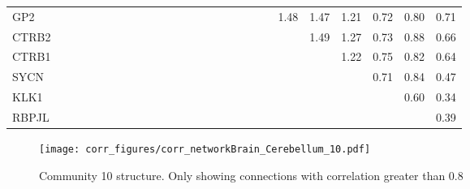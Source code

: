 \begin{longtable}{lrrrrrrrrrrrrrrrrrrrrrrrrr}
GP2      &              &              &              &             &             &             &             &            &              &            &            &            &             &           &             &                &           &               &           &        1.48 &        1.47 &       1.21 &       0.72 &        0.80 &        0.71 \\
CTRB2    &              &              &              &             &             &             &             &            &              &            &            &            &             &           &             &                &           &               &           &             &        1.49 &       1.27 &       0.73 &        0.88 &        0.66 \\
CTRB1    &              &              &              &             &             &             &             &            &              &            &            &            &             &           &             &                &           &               &           &             &             &       1.22 &       0.75 &        0.82 &        0.64 \\
SYCN     &              &              &              &             &             &             &             &            &              &            &            &            &             &           &             &                &           &               &           &             &             &            &       0.71 &        0.84 &        0.47 \\
KLK1     &              &              &              &             &             &             &             &            &              &            &            &            &             &           &             &                &           &               &           &             &             &            &            &        0.60 &        0.34 \\
RBPJL    &              &              &              &             &             &             &             &            &              &            &            &            &             &           &             &                &           &               &           &             &             &            &            &             &        0.39 \\
\end{longtable}


\begin{figure}[h!]
\centering
\texttt{[image: corr\_figures/corr\_networkBrain\_Cerebellum\_10.pdf]}
\caption{Community 10 structure. Only showing connections with correlation greater than 0.8}
\end{figure}




